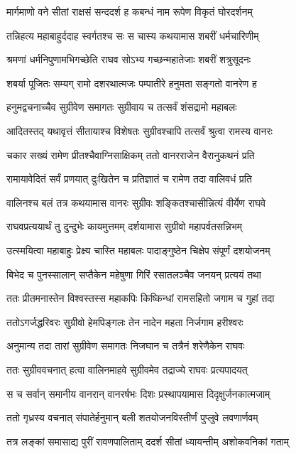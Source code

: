 \twolineshloka
{मार्गमाणो वने सीतां राक्षसं सन्ददर्श ह}
{कबन्धं नाम रूपेण विकृतं घोरदर्शनम्} %

\twolineshloka
{तन्निहत्य महाबाहुर्ददाह स्वर्गतश्च सः}
{स चास्य कथयामास शबरीं धर्मचारिणीम्} %

\twolineshloka
{श्रमणां धर्मनिपुणामभिगच्छेति राघव}
{सोऽभ्य गच्छन्महातेजाः शबरीं शत्रुसूदनः} %

\twolineshloka
{शबर्या पूजितः सम्यग् रामो दशरथात्मजः}
{पम्पातीरे हनुमता सङ्गतो वानरेण ह} %

\twolineshloka
{हनुमद्वचनाच्चैव सुग्रीवेण समागतः}
{सुग्रीवाय च तत्सर्वं शंसद्रामो महाबलः} %

\twolineshloka
{आदितस्तद् यथावृत्तं सीतायाश्च विशेषतः}
{सुग्रीवश्चापि तत्सर्वं श्रुत्वा रामस्य वानरः} %

\twolineshloka
{चकार सख्यं रामेण प्रीतश्चैवाग्निसाक्षिकम्}
{ततो वानरराजेन वैरानुकथनं प्रति} %

\twolineshloka
{रामायावेदितं सर्वं प्रणयात् दुःखितेन च}
{प्रतिज्ञातं च रामेण तदा वालिवधं प्रति} %

\twolineshloka
{वालिनश्च बलं तत्र कथयामास वानरः}
{सुग्रीवः शङ्कितश्चासीन्नित्यं वीर्येण राघवे} %

\twolineshloka
{राघवप्रत्ययार्थं तु दुन्दुभेः कायमुत्तमम्}
{दर्शयामास सुग्रीवो महापर्वतसन्निभम्} %

\twolineshloka
{उत्स्मयित्वा महाबाहुः प्रेक्ष्य चास्ति महाबलः}
{पादाङ्गुष्ठेन चिक्षेप संपूर्णं दशयोजनम्} %

\twolineshloka
{बिभेद च पुनस्सालान् सप्तैकेन महेषुणा}
{गिरिं रसातलञ्चैव जनयन् प्रत्ययं तथा} %

\twolineshloka
{ततः प्रीतमनास्तेन विश्वस्तस्स महाकपिः}
{किष्किन्धां रामसहितो जगाम च गुहां तदा} %

\twolineshloka
{ततोऽगर्जद्धरिवरः सुग्रीवो हेमपिङ्गलः}
{तेन नादेन महता निर्जगाम हरीश्वरः} %

\twolineshloka
{अनुमान्य तदा तारां सुग्रीवेण समागतः}
{निजघान च तत्रैनं शरेणैकेन राघवः} %

\twolineshloka
{ततः सुग्रीववचनात् हत्वा वालिनमाहवे}
{सुग्रीवमेव तद्राज्ये राघवः प्रत्यपादयत्} %

\twolineshloka
{स च सर्वान् समानीय वानरान् वानरर्षभः}
{दिशः प्रस्थापयामास दिदृक्षुर्जनकात्मजाम्} %

\twolineshloka
{ततो गृध्रस्य वचनात् संपातेर्हनुमान् बली}
{शतयोजनविस्तीर्णं पुप्लुवे लवणार्णवम्} %

\twolineshloka
{तत्र लङ्कां समासाद्य पुरीं रावणपालिताम्}
{ददर्श सीतां ध्यायन्तीम् अशोकवनिकां गताम्} %

